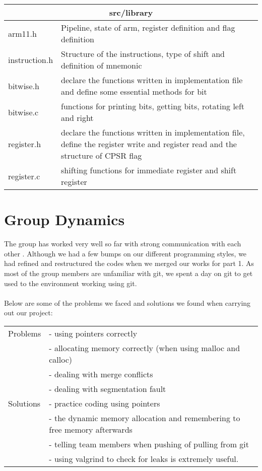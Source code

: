 \documentclass[11pt]{article}
\begin{document}
\begin{tabular}{ |p{5cm}|p{10cm}|  }
\hline
\multicolumn{2}{|c|}{ src/library  } \\
\hline
arm11.h & Pipeline, state of arm, register definition and flag definition \\
\hline
instruction.h & Structure of the instructions, type of shift and definition of
mnemonic\\
 \hline
bitwise.h & declare the functions written in implementation file
and define some essential methods for bit \\
\hline
bitwise.c & functions for printing bits, getting bits, rotating left and right\\
\hline
register.h  &  declare the functions written in implementation file, define the
register write and register read and the structure of CPSR flag \\
\hline
register.c & shifting functions for immediate register and shift register \\
\hline
\end{tabular}

\pagebreak

\section{Group Dynamics}

The group has worked very well so far with strong communication with each other
. Although we had a few bumps on our different programming styles, we had
refined and restructured the codes when we merged our works for part 1. As most
 of the group members are unfamiliar with git, we spent a day on git to get
used to the environment working using git. \\\\
Below are some of the problems we faced and solutions we found when carrying
out our project:\\

\begin{tabular}{ |p{5cm}|p{10cm}| }
\hline
Problems
& - using pointers correctly \\
& - allocating memory correctly (when using malloc and calloc)\\
& - dealing with merge conflicts \\
& - dealing with segmentation fault \\
\hline
Solutions
& - practice coding using pointers\\
& - the dynamic memory allocation and remembering to free memory afterwards\\
& - telling team members when pushing of pulling from git \\
& - using valgrind to check for leaks is extremely useful.\\
\hline
\end{tabular}
\end{document}
